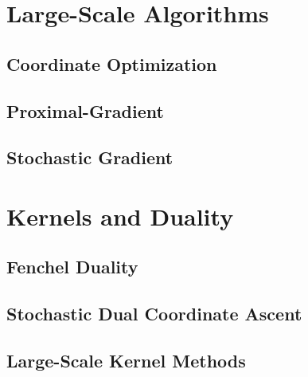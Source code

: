 \documentclass{article}
\begin{document}
\section{Large-Scale Algorithms}
\label{sec:large-scale-algor}

\subsection{Coordinate Optimization}
\label{sec:coord-optim}

\subsection{Proximal-Gradient}
\label{sec:proximal-gradient}

\subsection{Stochastic Gradient}
\label{sec:stochastic-gradient}

\section{Kernels and Duality}
\label{sec:kernels-duality}

\subsection{Fenchel Duality}
\label{sec:fenchel-duality}

\subsection{Stochastic Dual Coordinate Ascent}
\label{sec:stoch-dual-coord}

\subsection{Large-Scale Kernel Methods}
\label{sec:large-scale-kernel}
\end{document}
